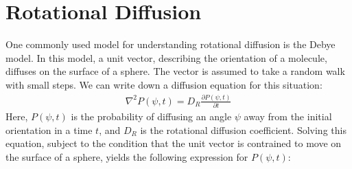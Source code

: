 \documentclass[12pt,a4paper]{article}
\begin{document}
\section{Rotational Diffusion}
One commonly used model for understanding rotational diffusion is the Debye model. In this model, a unit vector, describing the orientation of a molecule, diffuses on the surface of a sphere. The vector is assumed to take a random walk with small steps. We can write down a diffusion equation for this situation:
\begin{align*}
\nabla^2P(\psi, t)= D_R \frac{\partial P(\psi, t)}{\partial t}
\end{align*}
Here, $P(\psi, t)$ is the probability of diffusing an angle $\psi$ away from the initial orientation in a time $t$, and $D_R$ is the rotational diffusion coefficient. Solving this equation, subject to the condition that the unit vector is contrained to move on the surface of a sphere, yields the following expression for $P(\psi, t)$:
\end{document}
